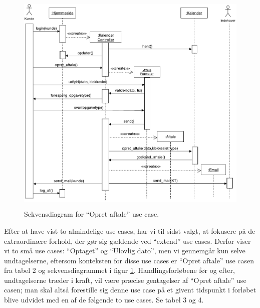 \documentclass[12pt]{article}   %
\begin{document}
\begin{figure}[!ht]
\includegraphics[width=14cm, height=11cm]{seq.pdf}
\caption{Sekvensdiagram for ``Opret aftale'' use case.}
\label{fig:aft}
\end{figure}

Efter at have vist to almindelige use cases, har vi til sidst valgt, at fokusere på de extraordinære forhold, der gør sig gældende ved ``extend'' use cases. Derfor viser vi to små use cases: ``Optaget'' og ``Ulovlig dato'', men vi gennemgår kun selve undtagelserne, eftersom konteksten for
disse use cases er ``Opret aftale'' use casen fra tabel
2 og sekvensdiagrammet i figur \ref{fig:aft}. Handlingsforløbene før og efter, undtagelserne træder i
kraft, vil være præcise gentagelser af ``Opret aftale'' use casen; man skal
altså forestille sig denne use case på et givent tidspunkt i forløbet
blive udvidet med en af de følgende to use cases. Se tabel 3 og 4.\\ 
\end{document}
